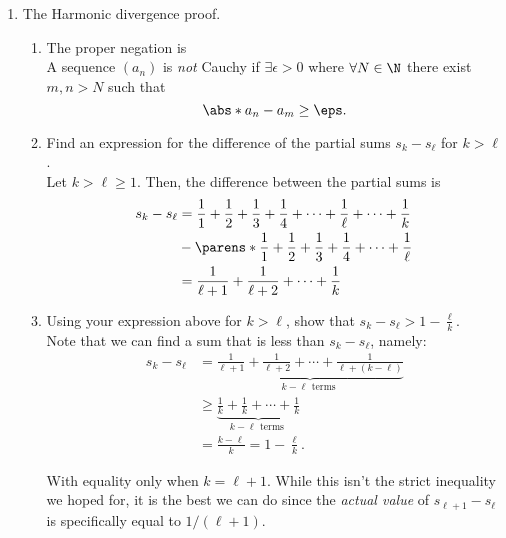 \documentclass{article}
\begin{document}
\begin{enumerate}
\begin{proof}[$(r^{n})$ converges to 0 or 1]
        \end{proof}

  \item The Harmonic divergence proof.
    \begin{enumerate}
      \item The proper negation is\\
            A sequence $(a_{n})$ is \emph{not} Cauchy if $\exists \epsilon > 0$ where $\forall N \in \N$
            there exist $m, n > N$ such that
            \[
            \abs*{a_{n} - a_{m}} \ge \eps.
            \]

      \item Find an expression for the difference of the partial sums $s_{k} - s_{\ell}$ for $k > \ell$.\\
            Let $k > \ell \ge 1$. Then, the difference between the partial sums is
            \begin{align*}
            s_{k} - s_{\ell} &= \frac{1}{1} + \frac{1}{2} + \frac{1}{3} + \frac{1}{4} + \cdots + \frac{1}{\ell} + \cdots + \frac{1}{k}\\
              &- \parens*{\frac{1}{1} + \frac{1}{2} + \frac{1}{3} + \frac{1}{4} + \cdots + \frac{1}{\ell}}\\
              &= \frac{1}{\ell + 1} + \frac{1}{\ell + 2} + \cdots + \frac{1}{k}\\
            \end{align*}

      \item\label{ineq}
            Using your expression above for $k > \ell$, show that $s_{k} - s_{\ell} > 1 - \frac{\ell}{k}$.\\
            Note that we can find a sum that is less than $s_{k} - s_{\ell}$, namely:
            \begin{align*}
              s_{k} - s_{\ell} &= \underbrace{\frac{1}{\ell + 1} + \frac{1}{\ell + 2} + \cdots + \frac{1}{\ell + (k - \ell)}}_{k - \ell \textrm{ terms }}\\
              &\ge \underbrace{\frac{1}{k} + \frac{1}{k} + \cdots + \frac{1}{k}}_{k - \ell \textrm{ terms }}\\
              &= \frac{k - \ell}{k} = 1 - \frac{\ell}{k}.
            \end{align*}

            With equality only when $k = \ell + 1$. While this isn't the strict inequality we hoped for, it is the best we can do
            since the \emph{actual value} of $s_{\ell + 1} - s_{\ell}$ is specifically equal to $1/(\ell + 1)$.


\end{enumerate}
\end{enumerate}
\end{document}
